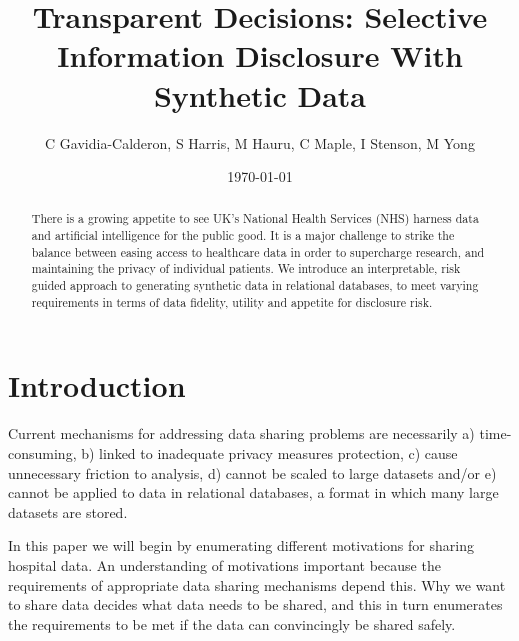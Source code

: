 \documentclass[11pt]{article}
\begin{document}
\title{Transparent Decisions: Selective Information Disclosure With Synthetic Data}
\author{C Gavidia-Calderon, S Harris, M Hauru, C Maple, I Stenson, M Yong}
\date{\today} %
\maketitle
\begin{abstract}
There is a growing appetite to see UK's National Health Services (NHS) harness data and artificial intelligence for the public good. It is a major challenge to strike the balance between easing access to healthcare data in order to supercharge research, and maintaining the privacy of individual patients. We introduce an interpretable, risk guided approach to generating synthetic data in relational databases, to meet varying requirements in terms of data fidelity, utility and appetite for disclosure risk.
\end{abstract}

\section{Introduction}

Current mechanisms for addressing data sharing problems are necessarily a) time-consuming, b) linked to inadequate privacy measures protection, c) cause unnecessary friction to analysis, d) cannot be scaled to large datasets and/or e) cannot be applied to data in relational databases, a format in which many large datasets are stored.


In this paper we will begin by enumerating different motivations for sharing hospital data. An understanding of motivations important because the requirements of appropriate data sharing mechanisms depend this. Why we want to share data decides what data needs to be shared, and this in turn enumerates the requirements to be met if the data can convincingly be shared safely. 
\end{document}
